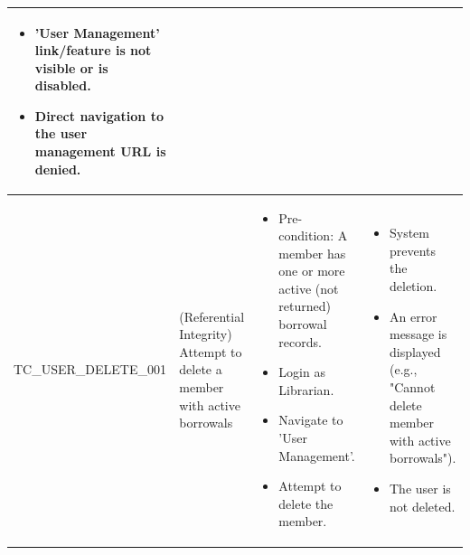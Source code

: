 \documentclass[10pt, a4paper]{report}
\begin{document}
\begin{longtable}{|>{\raggedright\arraybackslash}p{4.5cm}|>{\raggedright\arraybackslash}p{4cm}|>{\raggedright\arraybackslash}p{4.5cm}|>{\raggedright\arraybackslash}p{4cm}|}
\begin{itemize}[noitemsep, topsep=0pt, partopsep=0pt, leftmargin=*]
        \item 'User Management' link/feature is not visible or is disabled.
        \item Direct navigation to the user management URL is denied.
    \end{itemize} \\ \hline
TC\_USER\_DELETE\_001 & (Referential Integrity) Attempt to delete a member with active borrowals & 
    \begin{itemize}[noitemsep, topsep=0pt, partopsep=0pt, leftmargin=*]
        \item Pre-condition: A member has one or more active (not returned) borrowal records.
        \item Login as Librarian.
        \item Navigate to 'User Management'.
        \item Attempt to delete the member.
    \end{itemize} & 
    \begin{itemize}[noitemsep, topsep=0pt, partopsep=0pt, leftmargin=*]
        \item System prevents the deletion.
        \item An error message is displayed (e.g., "Cannot delete member with active borrowals").
        \item The user is not deleted.
    \end{itemize} \\ \hline


\end{longtable}
\end{document}
